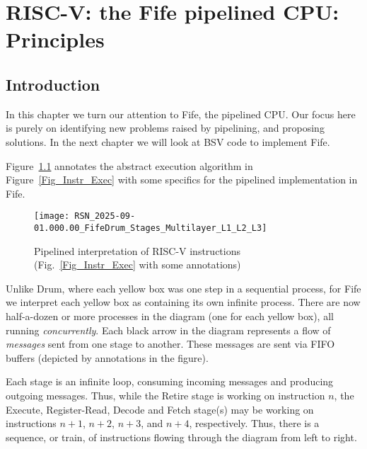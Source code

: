 

\chapter{RISC-V: the Fife pipelined CPU: Principles}


\setcounter{page}{1}
\renewcommand{\thepage}{\arabic{chapter}-\arabic{page}}

\label{ch_Fife_Principles}


\section{Introduction}

In this chapter we turn our attention to Fife, the pipelined CPU.  Our
focus here is purely on identifying new problems raised by pipelining,
and proposing solutions.  In the next chapter we will look at BSV code
to implement Fife.

Figure~\ref{Fig_Instr_Exec_w_FIFOs} annotates the abstract execution
algorithm in Figure~\ref{Fig_Instr_Exec} with some specifics for the
pipelined implementation in Fife.
\begin{figure}[htbp]
  \centerline{\texttt{[image: RSN\_2025-09-01.000.00\_FifeDrum\_Stages\_Multilayer\_L1\_L2\_L3]}}
  \caption{\label{Fig_Instr_Exec_w_FIFOs}Pipelined interpretation of RISC-V instructions (Fig.~\ref{Fig_Instr_Exec} with some annotations)}
\end{figure}
Unlike Drum, where each yellow box was one step in a sequential
process, for Fife we interpret each yellow box as containing its own
infinite process.  There are now half-a-dozen or more processes in the
diagram (one for each yellow box), all running \emph{concurrently}.
Each black arrow in the diagram represents a flow of \emph{messages}
sent from one stage to another.  These messages are sent via FIFO
buffers (depicted by
annotations in the figure).

Each stage is an infinite loop, consuming incoming messages and
producing outgoing messages.  Thus, while the Retire stage is working
on instruction $n$, the Execute, Register-Read, Decode and Fetch
stage(s) may be working on instructions $n+1$, $n+2$, $n+3$, and
$n+4$, respectively.  Thus, there is a sequence, or train, of
instructions flowing through the diagram from left to right.

